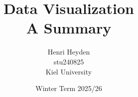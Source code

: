 

\title{Data Visualization \\ \small A Summary}
\date{Winter Term 2025/26}
\author{Henri Heyden \\%
 \small stu240825 \\%
 \small Kiel University%
}


    \maketitle
    
    

    \tableofcontents

    
    
    
    
    
    
    
    
    \appendix
    


